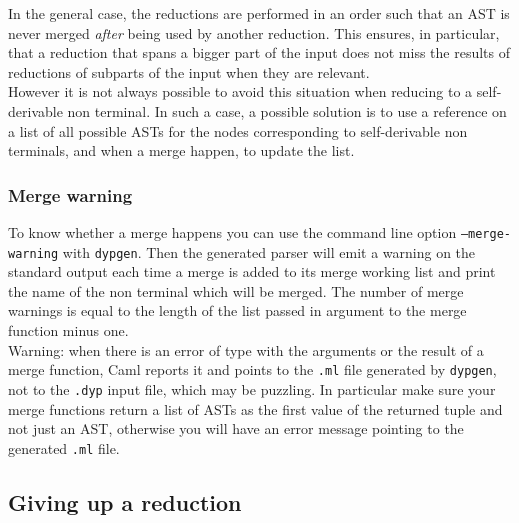 \documentclass[12pt]{article}
\begin{document}
{In the general case, the reductions are performed in an order such that an AST is never merged \emph{after} being used by another reduction. This ensures, in particular, that a reduction that spans a bigger part of the input does not miss the results of reductions of subparts of the input when they are relevant.\\

However it is not always possible to avoid this situation when reducing to a self-derivable non terminal. In such a case, a possible solution is to use a reference on a list of all possible ASTs for the nodes corresponding to self-derivable non terminals, and when a merge happen, to update the list.

\subsubsection{Merge warning}

To know whether a merge happens you can use the command line option \texttt{--merge-warning} with \texttt{dypgen}. Then the generated parser will emit a warning on the standard output each time a merge is added to its merge working list and print the name of the non terminal which will be merged. The number of merge warnings is equal to the length of the list passed in argument to the merge function minus one.\\

Warning: when there is an error of type with the arguments or the result of a merge function, Caml reports it and points to the \texttt{.ml} file generated by \texttt{dypgen}, not to the \texttt{.dyp} input file, which may be puzzling. In particular make sure your merge functions return a list of ASTs as the first value of the returned tuple and not just an AST, otherwise you will have an error message pointing to the generated \verb|.ml| file.

\subsection{Giving up a reduction}

}
\end{document}
